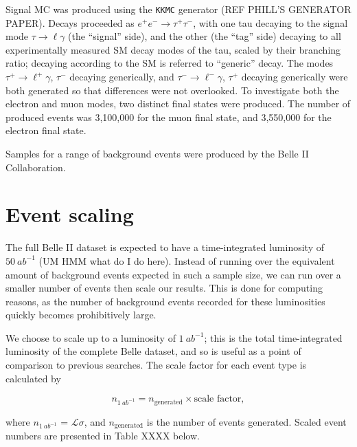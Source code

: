 \documentclass[12pt]{thesis}  %
\begin{document}
Signal MC was produced using the \texttt{KKMC} generator (REF PHILL'S GENERATOR PAPER). Decays proceeded as $e^+ e^- \to \tau^+ \tau^-$, with one tau decaying to the signal mode $\tau \to \ell \gamma$ (the ``signal'' side), and the other (the ``tag'' side) decaying to all experimentally measured SM decay modes of the tau, scaled by their branching ratio; decaying according to the SM is referred to ``generic'' decay. The modes $\tau^+ \to \ell^+ \gamma$, $\tau^-$ decaying generically, and $\tau^- \to \ell^- \gamma$, $\tau^+$ decaying generically were both generated so that differences were not overlooked. To investigate both the electron and muon modes, two distinct final states were produced. The number of produced events was 3,100,000 for the muon final state, and 3,550,000 for the electron final state.

Samples for a range of background events were produced by the Belle II Collaboration. 


\section{Event scaling}

The full Belle II dataset is expected to have a time-integrated luminosity of $\SI{50}{ab^{-1}}$ (UM HMM what do I do here). Instead of running over the equivalent amount of background events expected in such a sample size, we can run over a smaller number of events then scale our results. This is done for computing reasons, as the number of background events recorded for these luminosities quickly becomes prohibitively large.

We choose to scale up to a luminosity of $\SI{1}{ab^{-1}}$; this is the total time-integrated luminosity of the complete Belle dataset, and so is useful as a point of comparison to previous searches. The scale factor for each event type is calculated by

\begin{equation}
n_{\SI{1}{ab^{-1}}} = n_{\text{generated}} \times \text{scale factor},
\end{equation}

where $n_{\SI{1}{ab^{-1}}}$ = $\mathcal{L} \sigma$, and $n_{\text{generated}}$ is the number of events generated. Scaled event numbers are presented in Table XXXX below.
\end{document}
